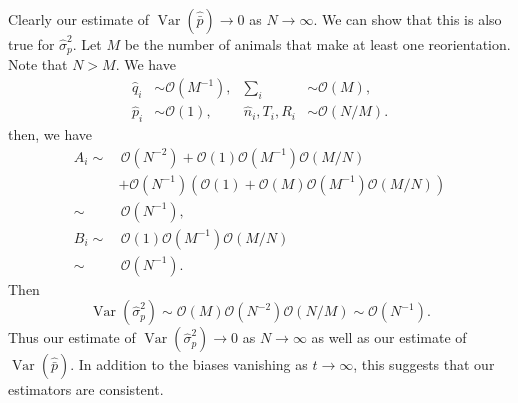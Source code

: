 \documentclass[12pt]{article}
\newcommand{\pdiff}[3][\rule{0mm}{0mm}]{\frac{\partial^{#1} #2}{\partial {#3}^{#1}}}
\newcommand{\CO}{\mathcal{O}}
\DeclareMathOperator{\var}{Var}
\newcommand{\prn}[1]{\left ( #1 \right )}
\begin{document}
Clearly our estimate of $\var(\hat{\bar{p}})\to0$ as $N\to\infty$. We can show that this is also true for $\hat{\sigma}_p^2$. Let $M$ be the number of animals that make at least one reorientation. Note that $N>M$. We have
%
\begin{equation}\label{eq:orderNM}
  \begin{aligned}
    \hat{q}_i &\sim \CO(M^{-1}),
    & \sum_i &\sim \CO(M), \\
    \hat{p}_i &\sim \CO(1),
    & \hat{n}_i,T_i,R_i &\sim \CO(N/M).
  \end{aligned}
\end{equation}
%
then, we have
%
\begin{equation}\label{eq:coefforder}
  \begin{aligned}
    A_i \sim&\,
    \CO(N^{-2}) + \CO(1)\CO(M^{-1})\CO(M/N)
    \\&
    + \CO(N^{-1})\prn{\CO(1) + \CO(M)\CO(M^{-1})\CO(M/N)}
    \\ \sim&\, \CO(N^{-1}),\\
    B_i \sim&\, \CO(1)\CO(M^{-1})\CO(M/N)\\
      \sim&\, \CO(N^{-1}).
  \end{aligned}
\end{equation}
%
Then
%
\begin{equation}\label{eq:ordervarvarp}
  \var(\hat{\sigma}_p^2) \sim \CO(M)\CO(N^{-2})\CO(N/M) \sim \CO(N^{-1}).
\end{equation}
%
Thus our estimate of $\var(\hat{\sigma}_p^2)\to0$ as $N\to\infty$ as well as our estimate of $\var(\hat{\bar{p}})$. In addition to the biases vanishing as $t\to\infty$, this suggests that our estimators are consistent.






\end{document}
